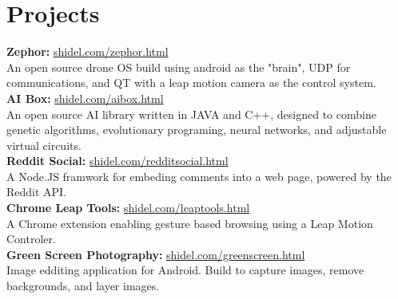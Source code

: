 \documentclass[10pt]{article}
\begin{document}
{\begin{minipage}[t]{0.5\textwidth}
\section{Projects} 
\textbf{Zephor:} \hfill \href{http://shidel.com/zephor.html}{shidel.com/zephor.html}
\vspace{0.5 mm}\\
An open source drone OS build using android as the "brain", UDP for communications, and QT with a leap motion camera as the control system. \\

\textbf{AI Box:} \hfill \href{http://shidel.com/aibox.html}{shidel.com/aibox.html}
\vspace{0.5 mm}\\
An open source AI library written in JAVA and C++, designed to combine genetic algorithms, evolutionary programing, neural networks, and adjustable virtual circuits. \\

\textbf{Reddit Social:} \hfill \href{http://shidel.com/redditsocial.html}{shidel.com/redditsocial.html}
\vspace{0.5 mm}\\
A Node.JS framwork for embeding comments into a web page, powered by the Reddit API. \\

\textbf{Chrome Leap Tools:} \hfill \href{http://shidel.com/leaptools.html}{shidel.com/leaptools.html}
\vspace{0.5 mm}\\
A Chrome extension enabling gesture based browsing using a Leap Motion Controler.\\

\textbf{Green Screen Photography:} \hfill \href{http://shidel.com/greenscreen.html}{shidel.com/greenscreen.html}
\vspace{0.5 mm}\\
Image edditing application for Android. Build to capture images, remove backgrounds, and
layer images. \\


\end{minipage} %
\hfill
\begin{minipage}[t]{0.44\textwidth} %
\vspace{0pt} %


\end{minipage}}
\end{document}
